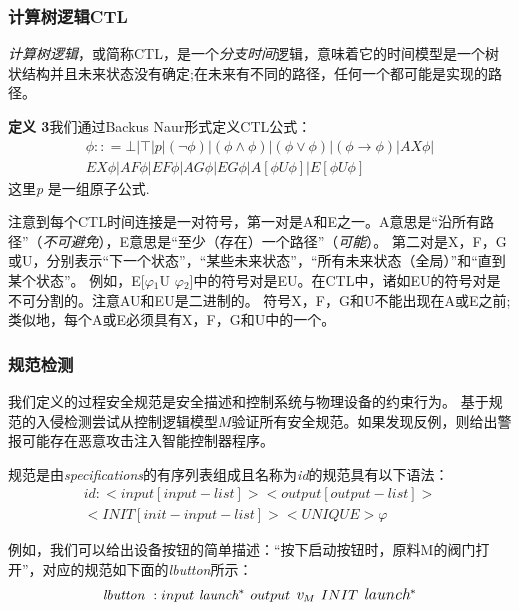 \subsubsection{计算树逻辑CTL}

\textit {计算树逻辑}，或简称CTL，是一个\textit {分支时间}逻辑，意味着它的时间模型是一个树状结构并且未来状态没有确定;在未来有不同的路径，任何一个都可能是实现的路径\parencite {klein2005fault}。

\textbf{定义 3}我们通过Backus Naur形式定义CTL公式：
\begin{equation} 
\begin{split}\phi :: = \bot | \top | p |(\neg\phi) | (\phi\wedge\phi) | (\phi\vee\phi) | (\phi\rightarrow\phi) | AX\phi |\\ EX\phi | AF\phi | EF\phi | AG\phi | EG\phi | A[\phi U \phi] | E[\phi U \phi]\end{split}
\end{equation}
这里\textit{p }是一组原子公式.

注意到每个CTL时间连接是一对符号，第一对是A和E之一。A意思是“沿所有路径”（\textit {不可避免}），E意思是“至少（存在）一个路径”（\textit {可能}）。 第二对是X，F，G或U，分别表示“下一个状态”，“某些未来状态”，“所有未来状态（全局）”和“直到某个状态”。 例如，E[\textit{$\varphi{}$}$_{1 }$U \textit{$\varphi{}$}$_{2}$]中的符号对是EU。在CTL中，诸如EU的符号对是不可分割的。注意AU和EU是二进制的。 符号X，F，G和U不能出现在A或E之前;类似地，每个A或E必须具有X，F，G和U中的一个。

\subsubsection{规范检测}

我们定义的过程安全规范是安全描述和控制系统与物理设备的约束行为。 基于规范的入侵检测尝试从控制逻辑模型$M$验证所有安全规范。如果发现反例，则给出警报可能存在恶意攻击注入智能控制器程序。

规范是由\textit {specifications}的有序列表组成且名称为\textit {id}的规范具有以下语法：
\[\begin{split}
id:  <input [input-list]> <output [output-list]> \\
<INIT [init-input-list]> <UNIQUE> \varphi
\end{split}
\]

例如，我们可以给出设备按钮的简单描述：“按下启动按钮时，原料M的阀门打开”，对应的规范如下面的\textit {lbutton}所示：
\[\raggedright
{ \textit{lbutton }: input~ \textit{launch}}{\small {^\ast} }{\large
~output~ \textit{v}_{M} ~INIT~ \textit{launch}}{\small {^\ast} }
\]

